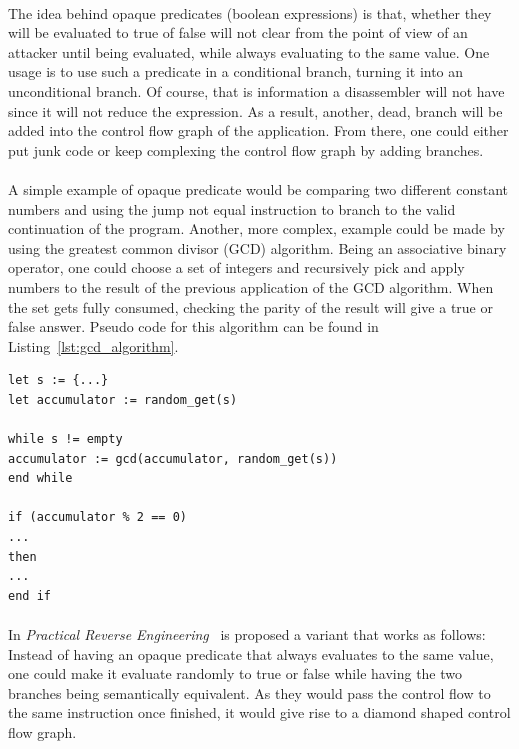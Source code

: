\paragraph{}
The idea behind opaque predicates (boolean expressions) is that, whether they will be evaluated to true of false will not clear from the point of view of an attacker until being evaluated, while always evaluating to the same value. One usage is to use such a predicate in a conditional branch, turning it into an unconditional branch. Of course, that is information a disassembler will not have since it will not reduce the expression. As a result, another, dead, branch will be added into the control flow graph of the application. From there, one could either put junk code or keep complexing the control flow graph by adding branches.

\paragraph{}
A simple example of opaque predicate would be comparing two different constant numbers and using the jump not equal instruction to branch to the valid continuation of the program. Another, more complex, example could be made by using the greatest common divisor (GCD) algorithm. Being an associative binary operator, one could choose a set of integers and recursively pick and apply numbers to the result of the previous application of the GCD algorithm. When the set gets fully consumed, checking the parity of the result will give a true or false answer. Pseudo code for this algorithm can be found in Listing~\ref{lst:gcd_algorithm}. \\

\begin{lstlisting}[caption={Pseudo code for an opaque predicate based on the greatest common divisor algorithm.}, label={lst:gcd_algorithm}, frame=tlrb]
let s := {...}
let accumulator := random_get(s)

while s != empty
accumulator := gcd(accumulator, random_get(s))
end while

if (accumulator % 2 == 0) 
...
then
...
end if
\end{lstlisting}

\paragraph{}
In \textit{Practical Reverse Engineering}~\cite{Dang:2014:PRE:2636663} is proposed a variant that works as follows: Instead of having an opaque predicate that always evaluates to the same value, one could make it evaluate randomly to true or false while having the two branches being semantically equivalent. As they would pass the control flow to the same instruction once finished, it would give rise to a diamond shaped control flow graph.

